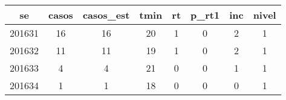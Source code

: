 \begin{tabular}{c|ccccccc}
  \hline
se & casos & casos\_est & tmin & rt & p\_rt1 & inc & nivel \\ 
  \hline
201631 & 16 & 16 & 20 & 1 & 0 & 2 & 1 \\ 
  201632 & 11 & 11 & 19 & 1 & 0 & 2 & 1 \\ 
  201633 & 4 & 4 & 21 & 0 & 0 & 1 & 1 \\ 
  201634 & 1 & 1 & 18 & 0 & 0 & 0 & 1 \\ 
   \hline
\end{tabular}
